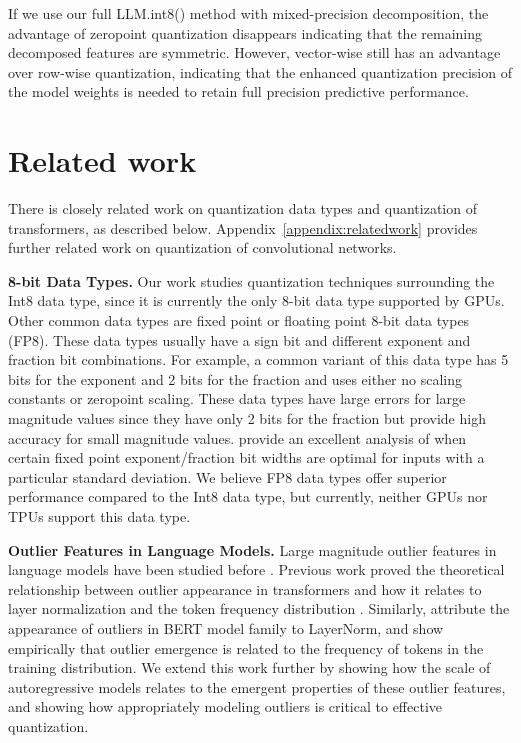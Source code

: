 If we use our full LLM.int8() method with mixed-precision decomposition, the advantage of zeropoint quantization disappears indicating that the remaining decomposed features are symmetric. However, vector-wise still has an advantage over row-wise quantization, indicating that the enhanced quantization precision of the model weights is needed to retain full precision predictive performance.

\section{Related work}

There is closely related work on quantization data types and quantization of transformers, as described below. Appendix~\ref{appendix:relatedwork} provides further related work on quantization of convolutional networks.

\textbf{8-bit Data Types.} Our work studies quantization techniques surrounding the Int8 data type, since it is currently the only 8-bit data type supported by GPUs. Other common data types are fixed point or floating point 8-bit data types (FP8). These data types usually have a sign bit and different exponent and fraction bit combinations. For example, a common variant of this data type has 5 bits for the exponent and 2 bits for the fraction \citep{wang2018training8bit,sun2019hybrid8bit,cambier2020shiftsqueeze,mellempudi2019bit8} and uses either no scaling constants or zeropoint scaling. These data types have large errors for large magnitude values since they have only 2 bits for the fraction but provide high accuracy for small magnitude values.
\citet{jin2022f8net} provide an excellent analysis of when certain fixed point exponent/fraction bit widths are optimal for inputs with a particular standard deviation. We believe FP8 data types offer superior performance compared to the Int8 data type, but currently, neither GPUs nor TPUs support this data type.

\textbf{Outlier Features in Language Models.} Large magnitude outlier features in language models have been studied before \citep{timkey2021all,bondarenko2021understanding, wei2022outlier,luo-etal-2021-positional}. Previous work proved the theoretical relationship between outlier appearance in transformers and how it relates to layer normalization and the token frequency distribution \citep{gao2019representation}. Similarly, \citet{kovaleva2021bert} attribute the appearance of outliers in BERT model family to LayerNorm, and \citet{puccetti2022outliers} show empirically that outlier emergence is related to the frequency of tokens in the training distribution. We extend this work further by showing how the scale of autoregressive models relates to the emergent properties of these outlier features, and showing how appropriately modeling outliers is critical to effective quantization. 

